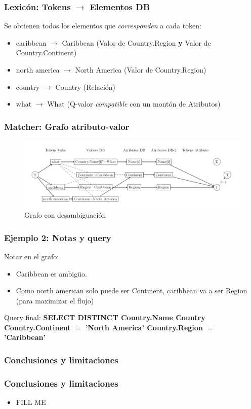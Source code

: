 \begin{frame}[<+->]
\frametitle{Lexicón: Tokens $\rightarrow$ Elementos DB}
Se obtienen todos los elementos que \textit{corresponden} a cada token:
  \begin{itemize}
    \item caribbean $\rightarrow$ Caribbean (Valor de Country.Region \textbf{y} Valor de Country.Continent)
    \item north america $\rightarrow$ North America (Valor de Country.Region)
    \item country $\rightarrow$ Country (Relación)
    \item what $\rightarrow$ What (Q-valor \textit{compatible} con un montón de Atributos)
  \end{itemize}
\end{frame}

\begin{frame}
\frametitle{Matcher: Grafo atributo-valor}
\begin{figure}
  \centering
    \includegraphics[scale=.43]{graficos/presentacion/ejemplo-grafo-2}
    \caption{Grafo con desambiguación}
\end{figure}
\end{frame}

\begin{frame}
\frametitle{Ejemplo 2: Notas y query}
Notar en el grafo:
  \begin{itemize}
    \item Caribbean es ambigüo.
    \item Como north american solo puede ser Continent, caribbean va a ser Region (para maximizar el flujo)
  \end{itemize}

Query final:\newline
\Large{\textbf{{\color{purple}SELECT DISTINCT} Country.Name  Country  Country.Continent $=$ {\color{green}'North America'}  Country.Region $=$ {\color{green}'Caribbean'}}}

\end{frame}



\subsubsection*{Conclusiones y limitaciones}
\begin{frame}
\frametitle{Conclusiones y limitaciones}
  \begin{itemize}
    \item {\color{red} FILL ME}
  \end{itemize}
\end{frame}
